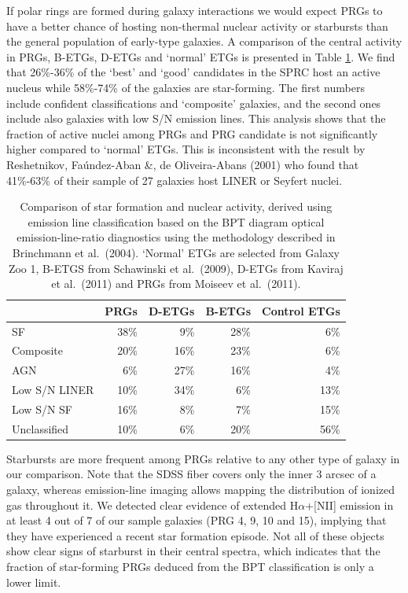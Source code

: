 \documentclass[useAMS,usenatbib]{mn2e}
\begin{document}
If polar rings are formed during galaxy interactions we would expect PRGs to have a better chance of hosting non-thermal nuclear activity or starbursts than the general population of early-type galaxies.
A comparison of the central activity in PRGs, B-ETGs, D-ETGs and `normal' ETGs is presented in Table \ref{t:compare}.
We find that 26\%-36\% of the `best' and `good' candidates in the SPRC host an active nucleus while 58\%-74\% of the galaxies are star-forming. The first numbers include confident classifications and `composite' galaxies, and the second ones include also galaxies with low S/N emission lines.
This analysis shows that the fraction of active nuclei among PRGs and PRG candidate is not significantly higher compared to `normal' ETGs. This is inconsistent with the result by Reshetnikov, Fa\'{u}ndez-Aban \&, de Oliveira-Abans (2001) who found that 41\%-63\% of their sample of 27 galaxies host LINER or Seyfert nuclei.

\begin{table}
 \centering
  \caption{Comparison of star formation and nuclear activity, derived
using emission line classification based on the BPT diagram optical emission-line-ratio diagnostics using the methodology described in Brinchmann et al.\ (2004). `Normal' ETGs are selected from Galaxy Zoo 1, B-ETGS from Schawinski et al.\ (2009), D-ETGs from Kaviraj et al.\ (2011) and PRGs from Moiseev et al.\ (2011).
  \label{t:compare}}
\begin{tabular}{lrrrr}
\hline
     & PRGs  & D-ETGs & B-ETGs & Control ETGs \\ 
\hline
SF             & 38\% & 9\%  & 28\%      & 6\% \\
Composite      & 20\% & 16\% & 23\%      & 6\% \\
AGN            & 6\%  & 27\% & 16\%      & 4\% \\
Low S/N LINER  & 10\% & 34\% & 6\%       & 13\% \\
Low S/N SF     & 16\% & 8\%  & 7\%       & 15\% \\
Unclassified   & 10\% & 6\% & 20\%      & 56\% \\
\hline
\end{tabular}
\end{table}
Starbursts are more frequent among PRGs relative to any other type of galaxy in our comparison.
Note that the SDSS fiber covers only the inner 3 arcsec of a galaxy, whereas emission-line imaging allows mapping the distribution of ionized gas throughout it. We detected clear evidence of extended H$\alpha$+[NII] emission in at least 4 out of 7 of our sample galaxies (PRG 4, 9, 10 and 15), implying that they have experienced a recent star formation episode. Not all of these objects show clear signs of starburst in their central spectra, which indicates that the fraction of star-forming PRGs deduced from the BPT classification is only a lower limit. 
\end{document}
